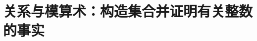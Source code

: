 \chapter[关系与模算术]{关系与模算术：构造集合并证明有关整数的事实}



\newpage


\newpage


\newpage


\newpage


\newpage


\newpage


\newpage
